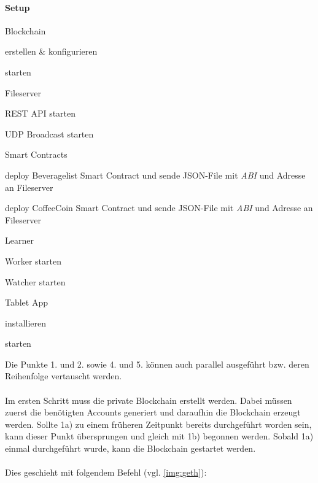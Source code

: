\paragraph{Setup}
\begin{legal}
	\item {Blockchain}
	\begin{legal}
		\item erstellen \& konfigurieren
		\item starten
	\end{legal}
				      	       	                            
	\item Fileserver
	\begin{legal}
		\item REST API starten
		\item UDP Broadcast starten
	\end{legal}
				      	       	                            
	\item Smart Contracts
	\begin{legal}
		\item deploy Beveragelist Smart Contract und sende JSON-File mit \textit{ABI} und Adresse an Fileserver
		\item deploy CoffeeCoin Smart Contract und sende JSON-File mit \textit{ABI} und Adresse an Fileserver
	\end{legal}
				      	       	                            
	\item Learner
	\begin{legal}
		\item Worker starten
		\item Watcher starten
	\end{legal}
				      	       	                            
	\item Tablet App
	\begin{legal}
		\item installieren
		\item starten
	\end{legal}
				      	       	                                
\end{legal}

Die Punkte 1. und 2. sowie 4. und 5. können auch parallel ausgeführt bzw. deren Reihenfolge vertauscht werden.\\\\
Im ersten Schritt muss die private Blockchain erstellt werden. Dabei müssen zuerst die benötigten Accounts generiert und daraufhin die Blockchain erzeugt werden. Sollte 1a) zu einem früheren Zeitpunkt bereits durchgeführt worden sein, kann dieser Punkt übersprungen und gleich mit 1b) begonnen werden.
Sobald 1a) einmal durchgeführt wurde, kann die Blockchain gestartet werden.
\\\\ Dies geschieht mit folgendem Befehl (vgl. \ref{img:geth}):\\

